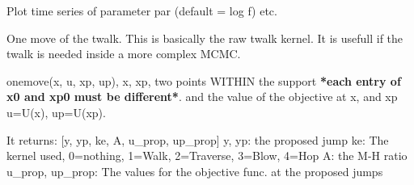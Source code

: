 \documentclass[letterpaper,10pt,english]{sphinxmanual}
\begin{document}
\begin{fulllineitems}

\begin{fulllineitems}
\label{api/pytwalk:refl1d.pytwalk.pytwalk.SimHop}
\end{fulllineitems}


\begin{fulllineitems}
\label{api/pytwalk:refl1d.pytwalk.pytwalk.SimTraverse}
\end{fulllineitems}


\begin{fulllineitems}
\label{api/pytwalk:refl1d.pytwalk.pytwalk.SimWalk}
\end{fulllineitems}


\begin{fulllineitems}
\label{api/pytwalk:refl1d.pytwalk.pytwalk.Simbeta}
\end{fulllineitems}


\begin{fulllineitems}
\label{api/pytwalk:refl1d.pytwalk.pytwalk.TS}
Plot time series of parameter par (default = log f) etc.

\end{fulllineitems}


\begin{fulllineitems}
\label{api/pytwalk:refl1d.pytwalk.pytwalk.onemove}
One move of the twalk.  This is basically the raw twalk kernel.
It is usefull if the twalk is needed inside a more complex MCMC.

onemove(x, u, xp, up),
x, xp, two points WITHIN the support \textbf{*each entry of x0 and xp0 must be different*}.
and the value of the objective at x, and xp
u=U(x), up=U(xp).

It returns: {[}y, yp, ke, A, u\_prop, up\_prop{]}
y, yp: the proposed jump
ke: The kernel used, 0=nothing, 1=Walk, 2=Traverse, 3=Blow, 4=Hop
A: the M-H ratio
u\_prop, up\_prop: The values for the objective func. at the proposed jumps

\end{fulllineitems}


\end{fulllineitems}
\end{document}
